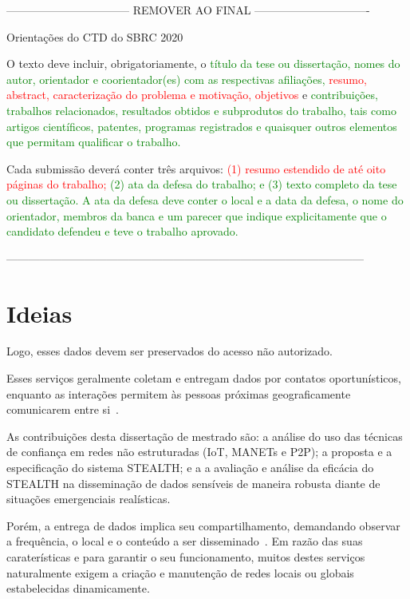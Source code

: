 {\color{red}--------------------------------- REMOVER AO FINAL -------------------------------}

Orientações do CTD do SBRC 2020

O texto deve incluir, obrigatoriamente, o \textcolor{green}{título da tese ou dissertação, nomes do autor, orientador e coorientador(es) com as respectivas afiliações,} \textcolor{red}{resumo, abstract, caracterização do problema e motivação, objetivos} e \textcolor{green}{contribuições, trabalhos relacionados, resultados obtidos e subprodutos do trabalho, tais como artigos científicos, patentes, programas registrados e quaisquer outros elementos que permitam qualificar o trabalho.}

Cada submissão deverá conter três arquivos: \textcolor{red}{(1) resumo estendido de até oito páginas do trabalho;} \textcolor{green}{(2) ata da defesa do trabalho; e (3) texto completo da tese ou dissertação. A ata da defesa deve conter o local e a data da defesa, o nome do orientador, membros da banca e um parecer que indique explicitamente que o candidato defendeu e teve o trabalho aprovado.}

{\color{red}------------------------------------------------------------------------------------------------}

\section*{Ideias}

Logo, esses dados devem ser preservados do acesso não autorizado.


Esses serviços geralmente coletam e entregam dados por contatos oportunísticos, enquanto as interações permitem às pessoas próximas geograficamente comunicarem entre si~\cite{garyfalos2008coupons}.

As contribuições desta dissertação de mestrado são: a análise do uso das técnicas de confiança em redes não estruturadas (IoT, MANETs e P2P); a proposta e a especificação do sistema STEALTH; e a a avaliação e análise da eficácia do STEALTH na disseminação de dados sensíveis de maneira robusta diante de situações emergenciais realísticas.

Porém, a entrega de dados implica seu compartilhamento, demandando observar a frequência, o local e o conteúdo a ser disseminado~\cite{sudhindra2014}. Em razão das suas caraterísticas e para garantir o seu funcionamento, muitos destes serviços naturalmente exigem a criação e manutenção de redes locais ou globais estabelecidas dinamicamente.
 
